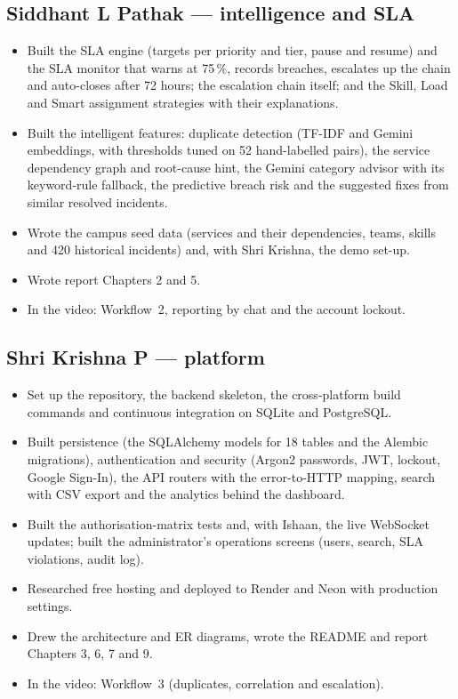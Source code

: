 \subsection*{Siddhant L Pathak --- intelligence and SLA}
\begin{itemize}
  \item Built the SLA engine (targets per priority and tier, pause and resume) and the SLA
    monitor that warns at 75\,\%, records breaches, escalates up the chain and auto-closes after
    72 hours; the escalation chain itself; and the Skill, Load and Smart assignment strategies
    with their explanations.
  \item Built the intelligent features: duplicate detection (TF-IDF and Gemini embeddings, with
    thresholds tuned on 52 hand-labelled pairs), the service dependency graph and root-cause
    hint, the Gemini category advisor with its keyword-rule fallback, the predictive breach
    risk and the suggested fixes from similar resolved incidents.
  \item Wrote the campus seed data (services and their dependencies, teams, skills and 420
    historical incidents) and, with Shri Krishna, the  demo set-up.
  \item Wrote report Chapters 2 and 5.
  \item In the video: Workflow~2, reporting by chat and the account lockout.
\end{itemize}

\subsection*{Shri Krishna P --- platform}
\begin{itemize}
  \item Set up the repository, the backend skeleton, the cross-platform build commands and
    continuous integration on SQLite and PostgreSQL.
  \item Built persistence (the SQLAlchemy models for 18 tables and the Alembic migrations),
    authentication and security (Argon2 passwords, JWT, lockout, Google Sign-In), the API
    routers with the error-to-HTTP mapping, search with CSV export and the analytics behind
    the dashboard.
  \item Built the authorisation-matrix tests and, with Ishaan, the live WebSocket updates; built
    the administrator's operations screens (users, search, SLA violations, audit log).
  \item Researched free hosting and deployed to Render and Neon with production settings.
  \item Drew the architecture and ER diagrams, wrote the README and report Chapters 3, 6, 7
    and 9.
  \item In the video: Workflow~3 (duplicates, correlation and escalation).
\end{itemize}

